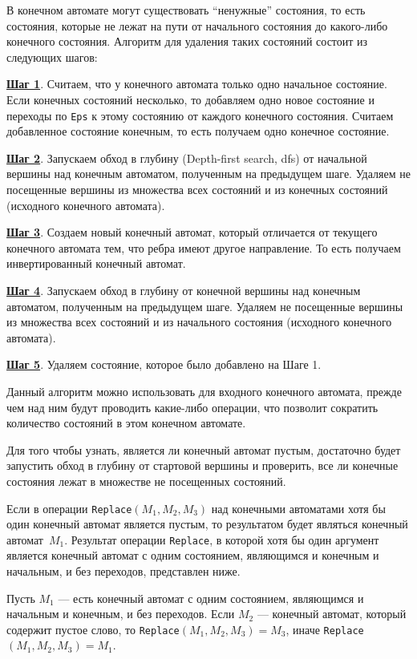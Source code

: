 В конечном автомате могут существовать ``ненужные'' состояния, то есть состояния, которые не лежат на пути от начального состояния до какого-либо конечного состояния. Алгоритм для удаления таких состояний состоит из следующих шагов:

\textbf{\underline{Шаг 1}}. Считаем, что у конечного автомата только одно начальное состояние. Если конечных состояний несколько, то добавляем одно новое состояние и переходы по \verb|Eps| к этому состоянию от каждого конечного состояния. Считаем добавленное состояние конечным, то есть получаем одно конечное состояние.

\textbf{\underline{Шаг 2}}. Запускаем обход в глубину (Depth-first search, dfs) от начальной вершины над конечным автоматом, полученным на предыдущем шаге. Удаляем не посещенные вершины из множества всех состояний и из конечных состояний (исходного конечного автомата).

\textbf{\underline{Шаг 3}}. Создаем новый конечный автомат, который отличается от текущего конечного автомата тем, что ребра имеют другое направление. То есть получаем инвертированный конечный автомат.

\textbf{\underline{Шаг 4}}. Запускаем обход в глубину от конечной вершины над конечным автоматом, полученным на предыдущем шаге. Удаляем не посещенные вершины из множества всех состояний и из начального состояния (исходного конечного автомата). 

\textbf{\underline{Шаг 5}}. Удаляем состояние, которое было добавлено на Шаге 1. 

Данный алгоритм можно использовать для входного конечного автомата, прежде чем над ним будут проводить какие-либо операции, что позволит сократить количество состояний в этом конечном автомате.

Для того чтобы узнать, является ли конечный автомат пустым, достаточно будет запустить обход в глубину от стартовой вершины и проверить, все ли конечные состояния лежат в множестве не посещенных состояний.

Если в операции \verb|Replace|$(M_1, M_2, M_3)$ над конечными автоматами хотя бы один конечный автомат является пустым, то результатом будет являться конечный автомат~$M_1$. Результат операции \verb|Replace|, в которой хотя бы один аргумент является конечный автомат с одним состоянием, являющимся и конечным и начальным, и без переходов, представлен ниже.

Пусть $M_1$ --- есть конечный автомат с одним состоянием, являющимся и начальным и конечным, и без переходов. Если $M_2$ --- конечный автомат, который содержит пустое слово, то \verb|Replace|$(M_1, M_2, M_3) = M_3$, иначе \verb|Replace|$(M_1, M_2, M_3) = M_1$. 

